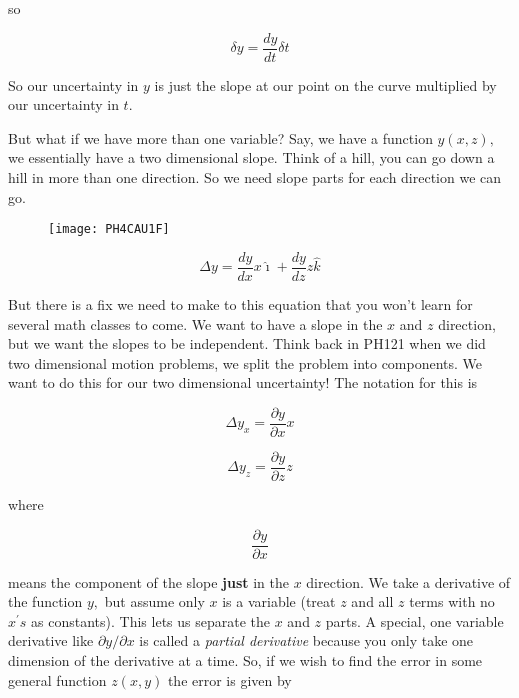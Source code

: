so

\begin{equation*}
   \delta y=\frac{dy}{dt}\delta t
\end{equation*}

So our uncertainty in $y$ is just the slope at our point on the curve multiplied by our uncertainty in $t.$

But what if we have more than one variable? Say, we have a function $y(x,z),$ we essentially have a two dimensional slope. Think of a hill, you can go down a hill in more than one direction. So we need slope parts for each direction we can go.

\begin{figure}[h!]
	\centering
    \texttt{[image: PH4CAU1F]}
\end{figure}

\begin{equation*}
   \Delta y=\frac{dy}{dx}x\hat{\imath}+\frac{dy}{dz}z\hat{k}
\end{equation*}

But there is a fix we need to make to this equation that you won't learn for several math classes to come. We want to have a slope in the $x$ and $z$ direction, but we want the slopes to be independent. Think back in PH121 when we did two dimensional motion problems, we split the problem into components. We want to do this for our two dimensional uncertainty! The notation for this is

\begin{equation*}
	\Delta y_{x}=\frac{\partial y}{\partial x}x
\end{equation*}

\begin{equation*}
	\Delta y_{z}=\frac{\partial y}{\partial z}z
\end{equation*}

where 

\begin{equation*}
	\frac{\partial y}{\partial x}
\end{equation*}

means the component of the slope \textbf{just} in the $x$ direction. We take a derivative of the function $y,$ but assume only $x$ is a variable (treat $z$ and all $z$ terms with no $x^{\prime }s$ as constants). This lets us separate the $x$ and $z$ parts. A special, one variable derivative like $\partial y/\partial x$ is called a \emph{partial derivative} because you only take one dimension of the derivative at a time. So, if we wish to find the error in some general function $z\left( x,y\right) $ the error is given by
 
